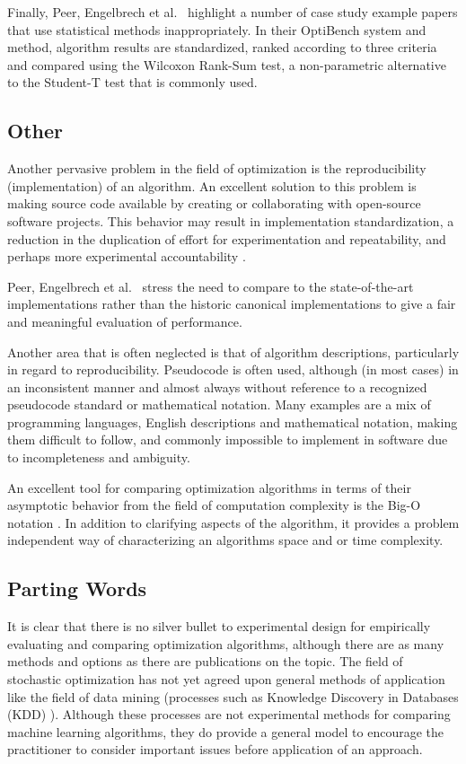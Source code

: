 Finally, Peer, Engelbrech et al.\ \cite{Peer2003} highlight a number of case study example papers that use statistical methods inappropriately. In their OptiBench system and method, algorithm results are standardized, ranked according to three criteria and compared using the Wilcoxon Rank-Sum test, a non-parametric alternative to the Student-T test that is commonly used.

% 
% 
\subsection{Other}
Another pervasive problem in the field of optimization is the reproducibility (implementation) of an algorithm. An excellent solution to this problem is making source code available by creating or collaborating with open-source software projects. This behavior may result in implementation standardization, a reduction in the duplication of effort for experimentation and repeatability, and perhaps more experimental accountability \cite{Eiben2002, Peer2003}.

Peer, Engelbrech et al.\ \cite{Peer2003} stress the need to compare to the state-of-the-art implementations rather than the historic canonical implementations to give a fair and meaningful evaluation of performance.

Another area that is often neglected is that of algorithm descriptions, particularly in regard to reproducibility. Pseudocode is often used, although (in most cases) in an inconsistent manner and almost always without reference to a recognized pseudocode standard or mathematical notation. Many examples are a mix of programming languages, English descriptions and mathematical notation, making them difficult to follow, and commonly impossible to implement in software due to incompleteness and ambiguity.

An excellent tool for comparing optimization algorithms in terms of their asymptotic behavior from the field of computation complexity is the Big-O notation \cite{Cormen2001}. In addition to clarifying aspects of the algorithm, it provides a problem independent way of characterizing an algorithms space and or time complexity.


% 
% 
\subsection{Parting Words}
It is clear that there is no silver bullet to experimental design for empirically evaluating and comparing optimization algorithms, although there are as many methods and options as there are publications on the topic. The field of stochastic optimization has not yet agreed upon general methods of application like the field of data mining (processes such as Knowledge Discovery in Databases (KDD) \cite{Fayyad1996}). Although these processes are not experimental methods for comparing machine learning algorithms, they do provide a general model to encourage the practitioner to consider important issues before application of an approach.

